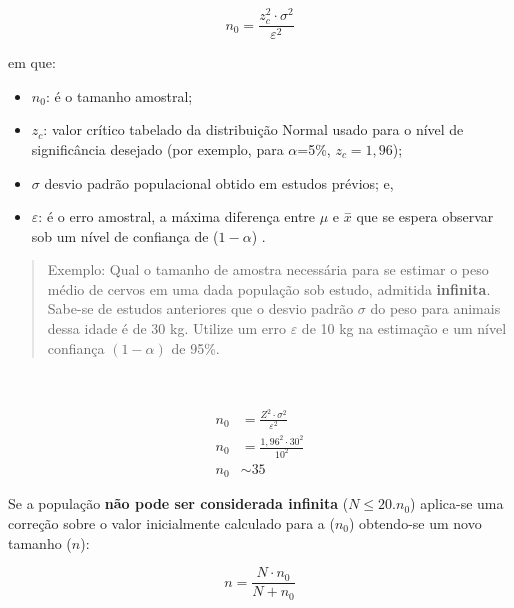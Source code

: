 \documentclass[
]{book}
\providecommand{\tightlist}{%
  \setlength{\itemsep}{0pt}\setlength{\parskip}{0pt}}
\begin{document}
\hfill\break

\[
n_{0} =  \frac{z_{c}^2 \cdot \sigma^2}{\varepsilon^2}
\]

\hfill\break

em que:

\hfill\break

\begin{itemize}
\tightlist
\item
  \(n_{0}\): é o tamanho amostral;\\
\item
  \(z_{c}\): valor crítico tabelado da distribuição Normal usado para o nível de significância desejado (por exemplo, para \(\alpha\)=5\%, \(z_{c}=1,96\));\\
\item
  \(\sigma\) desvio padrão populacional obtido em estudos prévios; e,\\
\item
  \(\varepsilon\): é o erro amostral, a máxima diferença entre \(\mu\) e \(\stackrel{-}{x}\) que se espera observar sob um nível de confiança de (\(1-\alpha\)) .
\end{itemize}

\hfill\break

\begin{quote}
Exemplo: Qual o tamanho de amostra necessária para se estimar o peso médio de cervos em uma dada população sob estudo, admitida \textbf{infinita}. Sabe-se de estudos anteriores que o desvio padrão \(\sigma\) do peso para animais dessa idade é de 30 kg. Utilize um erro \(\varepsilon\) de 10 kg na estimação e um nível confiança \((1-\alpha)\) de 95\%.
\end{quote}

~

\begin{align*}
n_{0} & = \frac{Z^{2} \cdot \sigma^{2}}{\varepsilon^{2}} \\
n_{0} & = \frac{1,96^{2} \cdot 30^{2}}{10^{2}} \\
n_{0} & \sim 35 
\end{align*}

\hfill\break

Se a população \textbf{não pode ser considerada infinita} (\(N \le 20.n_{0}\)) aplica-se uma correção sobre o valor inicialmente calculado para a (\(n_{0}\)) obtendo-se um novo tamanho (\(n\)):

\hfill\break

\[
n=\frac{N \cdot n_{0}}{N + n_{0}}
\]

\hfill\break
\end{document}
